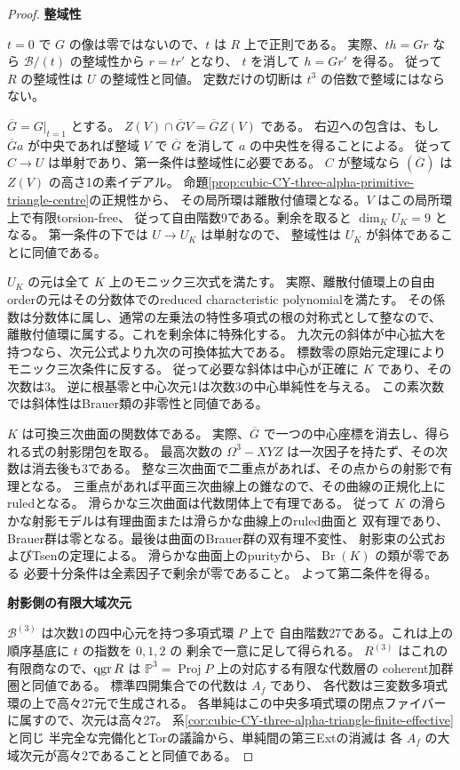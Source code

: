 \begin{proof}
\medskip\noindent\textbf{整域性}\par
$t=0$ で $G$ の像は零ではないので、$t$ は $R$ 上で正則である。
実際、$th=Gr$ なら $\mathcal B/(t)$ の整域性から $r=tr'$ となり、
$t$ を消して $h=Gr'$ を得る。
従って $R$ の整域性は $U$ の整域性と同値。
定数だけの切断は $t^3$ の倍数で整域にはならない。

$\overline G=G|_{t=1}$ とする。
$Z(V)\cap\overline G V=\overline G Z(V)$ である。
右辺への包含は、もし $\overline G a$ が中央であれば整域 $V$ で
$\overline G$ を消して $a$ の中央性を得ることによる。
従って $C\to U$ は単射であり、第一条件は整域性に必要である。
$C$ が整域なら $(\overline G)$ は $Z(V)$ の高さ1の素イデアル。
命題\ref{prop:cubic-CY-three-alpha-primitive-triangle-centre}の正規性から、
その局所環は離散付値環となる。$V$ はこの局所環上で有限torsion-free、
従って自由階数9である。剰余を取ると $\dim_K U_K=9$ となる。
第一条件の下では $U\to U_K$ は単射なので、
整域性は $U_K$ が斜体であることに同値である。

$U_K$ の元は全て $K$ 上のモニック三次式を満たす。
実際、離散付値環上の自由orderの元はその分数体でのreduced characteristic polynomialを満たす。
その係数は分数体に属し、通常の左乗法の特性多項式の根の対称式として整なので、
離散付値環に属する。これを剰余体に特殊化する。
九次元の斜体が中心拡大を持つなら、次元公式より九次の可換体拡大である。
標数零の原始元定理によりモニック三次条件に反する。
従って必要な斜体は中心が正確に $K$ であり、その次数は3。
逆に根基零と中心次元1は次数3の中心単純性を与える。
この素次数では斜体性はBrauer類の非零性と同値である。

$K$ は可換三次曲面の関数体である。
実際、$\overline G$ で一つの中心座標を消去し、得られる式の射影閉包を取る。
最高次数の $\Omega^3-XYZ$ は一次因子を持たず、その次数は消去後も3である。
整な三次曲面で二重点があれば、その点からの射影で有理となる。
三重点があれば平面三次曲線上の錐なので、その曲線の正規化上にruledとなる。
滑らかな三次曲面は代数閉体上で有理である。
従って $K$ の滑らかな射影モデルは有理曲面または滑らかな曲線上のruled曲面と
双有理であり、Brauer群は零となる。最後は曲面のBrauer群の双有理不変性、
射影束の公式およびTsenの定理による\cite{StacksTsenBrauer}。
滑らかな曲面上のpurityから、$\operatorname{Br}(K)$ の類が零である
必要十分条件は全素因子で剰余が零であること。
よって第二条件を得る。

\medskip\noindent\textbf{射影側の有限大域次元}\par
$\mathcal B^{(3)}$ は次数1の四中心元を持つ多項式環 $P$ 上で
自由階数27である。これは上の順序基底に $t$ の指数を $0,1,2$ の
剰余で一意に足して得られる。
$R^{(3)}$ はこれの有限商なので、$\operatorname{qgr} R$ は
$\mathbb P^3=\operatorname{Proj}P$ 上の対応する有限な代数層の
coherent加群圏と同値である。
標準四開集合での代数は $A_f$ であり、
各代数は三変数多項式環の上で高々27元で生成される。
各単純はこの中央多項式環の閉点ファイバーに属すので、次元は高々27。
系\ref{cor:cubic-CY-three-alpha-triangle-finite-effective}と同じ
半完全な完備化とTorの議論から、単純間の第三Extの消滅は
各 $A_f$ の大域次元が高々2であることと同値である。


\end{proof}
